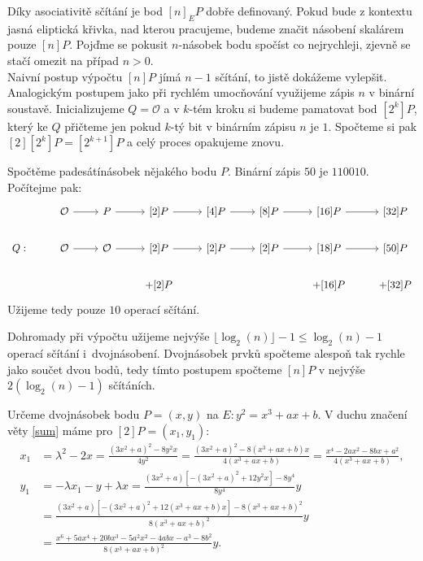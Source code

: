 \documentclass [12pt]{report}
\begin{document}
Díky asociativitě sčítání je bod $[n]_EP$ dobře definovaný. Pokud bude z kontextu jasná eliptická křivka, nad kterou pracujeme, budeme značit násobení skalárem pouze $[n]P$. Pojďme se pokusit $n$-násobek bodu spočíst co nejrychleji, zjevně se stačí omezit na případ $n > 0$.\\

Naivní postup výpočtu $[n] P$ jímá $n-1$ sčítání, to jistě dokážeme vylepšit. Analogickým postupem jako při rychlém umocňování využijeme zápis $n$ v binární soustavě. Inicializujeme $Q = \mathcal{O}$ a v $k$-tém kroku si budeme pamatovat bod $[2^k] P$, který ke $Q$ přičteme jen pokud $k$-tý bit v binárním zápisu $n$ je $1$. Spočteme si pak $[2][2^k] P = [2^{k+1}] P$ a celý proces opakujeme znovu.

\begin{priklad}
Spočtěme padesátínásobek nějakého bodu $P$. Binární zápis $50$ je $110010$. Počítejme pak:\\
\begin{equation*}
\begin{tikzcd}[arrows=to]
& \mathcal{O} \rar & P \rar & {[2]}P \rar & {[4]}P \rar & {[8]}P \rar & {[16]}P \rar & {[32]} P   \\
Q: &   \mathcal{O} \rar & \mathcal{O} \rar & {[2]}P \rar & {[2]}P \rar & {[2]}P \rar & {[18]}P \rar & {[50]} P   \\
 &  &  & + {[2]}P  & & & + {[16]}P  & +{[32]}P 
    \end{tikzcd} 
\end{equation*}
Užijeme tedy pouze $10$ operací sčítání.
\end{priklad}
 



Dohromady při výpočtu užijeme nejvýše $\lfloor \log_2(n) \rfloor -1 \leqslant \log_2(n)-1$ operací sčítání i~dvojnásobení. Dvojnásobek prvků spočteme alespoň tak rychle jako součet dvou bodů, tedy tímto postupem spočteme $[n]P$ v nejvýše $2( \log_2(n)-1)$ sčítáních. 

\begin{priklad}\label{priklad2}
Určeme dvojnásobek bodu $P = (x,y)$ na $E : y^2 = x^3 + ax + b$. V duchu značení věty \ref{sum} máme pro $[2] P = (x_1,y_1)$:
\begin{align*}
x_1 &= \lambda^2 - 2x = \frac{(3x ^2 + a)^2 - 8 y^2 x }{4 y ^2} = \frac{(3x ^2 + a)^2 - 8 (x^3+ax+b) x }{4 (x^3+ax+b)} = \frac{x^4-2a x^2 - 8bx + a^2}{4 (x^3+ax+b)},\\
y_1 &=  - \lambda x_1 - y + \lambda x = \frac{(3x^2 + a)[-(3x ^2 + a)^2 + 12 y^2 x] - 8y^4}{8y^4} y \\
&=  \frac{(3x^2 + a)[-(3x ^2 + a)^2 + 12 (x^3 + ax + b) x] - 8 (x^3 + ax + b)^2}{8(x^3 + ax + b)^2} y\\
&= \frac{x^6 + 5 a x^4 + 20 b x^3 - 5 a^2 x^2 - 4ab x - a^3 - 8 b^2}{8(x^3 + ax + b)^2} y.  \\
\end{align*}
\end{priklad}
\end{document}
